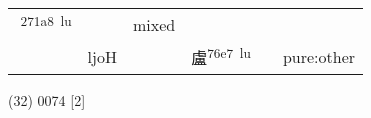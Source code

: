 \documentclass[14pt,a4paper]{scrartcl}
\begin{document}
\begin{longtable}[c]{@{}llllll@{}}
\begin{minipage}[t]{0.14\columnwidth}
𧆨\textsuperscript{271a8~lu}
\strut\end{minipage} &
\begin{minipage}[t]{0.14\columnwidth}\raggedright\strut
\strut\end{minipage} &
\begin{minipage}[t]{0.14\columnwidth}\raggedright\strut
mixed
\strut\end{minipage}\tabularnewline
\begin{minipage}[t]{0.14\columnwidth}\raggedright\strut
𧆣
\strut\end{minipage} &
\begin{minipage}[t]{0.14\columnwidth}\raggedright\strut
ljoH
\strut\end{minipage} &
\begin{minipage}[t]{0.14\columnwidth}\raggedright\strut
\strut\end{minipage} &
\begin{minipage}[t]{0.14\columnwidth}\raggedright\strut
盧\textsuperscript{76e7~lu}
\strut\end{minipage} &
\begin{minipage}[t]{0.14\columnwidth}\raggedright\strut
\strut\end{minipage} &
\begin{minipage}[t]{0.14\columnwidth}\raggedright\strut
pure:other
\strut\end{minipage}\tabularnewline
\bottomrule
\end{longtable}

(32) 0074 {[}2{]}
\end{document}

